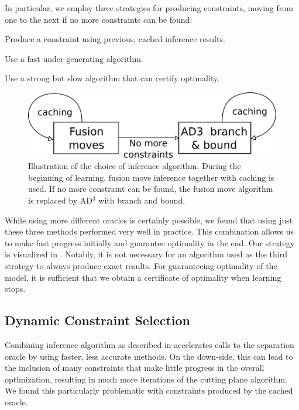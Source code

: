 In particular, we employ three strategies for producing constraints,
moving from one to the next if no more constraints can be found:
\begin{enumerate*}
    \item Produce a constraint using previous, cached inference results.
    \item Use a fast under-generating algorithm.
    \item Use a strong but slow algorithm that can certify optimality.
\end{enumerate*}

\begin{figure}
\centering
\includegraphics[width=\linewidth]{exact_learning/images/inference_algs}
\caption{%
Illustration of the choice of inference algorithm. During the beginning of learning,
fusion move inference together with caching is used. If no more constraint can be found,
the fusion move algorithm is replaced by AD$^3$ with branch and bound.
}
\end{figure}

While using more different oracles is certainly possible, we found
that using just these three methods performed very well in practice.  This
combination allows us to make fast progress initially and guarantee optimality
in the end. Our strategy is visualized in .
Notably, it is not necessary for an algorithm used as the third strategy to
always produce exact results. For guaranteeing optimality of the model, it is
sufficient that we obtain a certificate of optimality when learning stops.

\subsection{Dynamic Constraint Selection}
Combining inference algorithm as described in 
accelerates calls to the separation oracle by using faster, less accurate
methods. On the down-side, this can lead to the inclusion of many constraints
that make little progress in the overall optimization, resulting in much more
iterations of the cutting plane algorithm. We found this particularly problematic
with constraints produced by the cached oracle.

